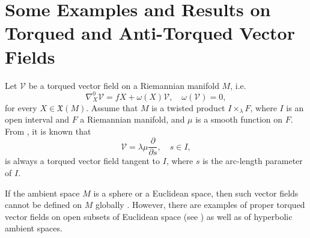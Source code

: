 \documentclass[12pt]{amsart}
\theoremstyle{definition}
\begin{document}




\section{Some Examples and Results on Torqued and Anti-Torqued Vector Fields} \label{examp}

Let $\mathcal{V}$ be a torqued vector field on a Riemannian manifold $M$, i.e.
\begin{equation*}
\nabla^0_X\mathcal{V}=fX+\omega(X)\mathcal{V}, \quad \omega(\mathcal{V})=0,    
\end{equation*}
for every $X\in\mathfrak{X}(M)$. Assume that $M$ is a twisted product $I\times_\lambda F$, where $I$ is an open interval and $F$ a Riemannian manifold, and $\mu$ is a smooth function on $F$. From \cite{c01}, it is known that 
\begin{equation*}
\mathcal{V}=\lambda \mu \frac{\partial}{\partial s}, \quad s \in I,    
\end{equation*}
is always a torqued vector field tangent to $I$, where $s$ is the arc-length parameter of $I$. 

If the ambient space $M$ is a sphere or a Euclidean space, then such vector fields cannot be defined on $M$ globally \cite{dan,dta}. However, there are examples of proper torqued vector fields on open subsets of Euclidean space (see \cite[Example 1]{dta}) as well as of hyperbolic ambient spaces.
\end{document}
